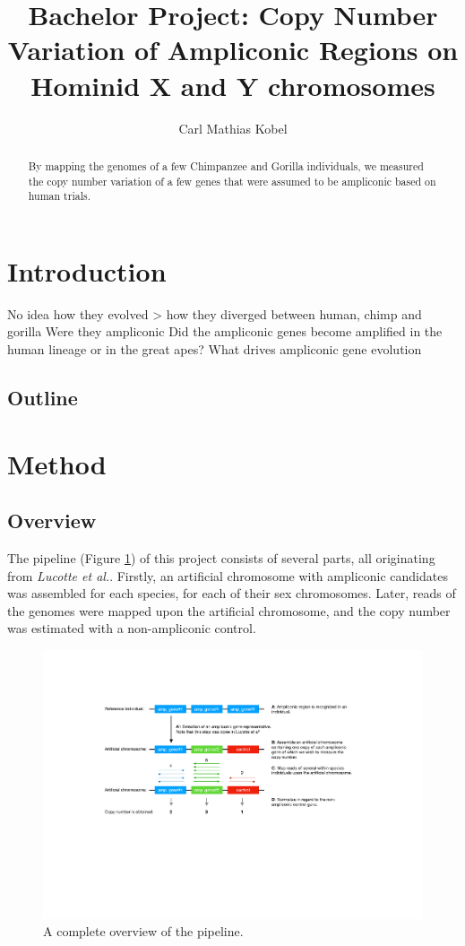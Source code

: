 \documentclass[
journal=jacsat, %
manuscript=article]{achemso}
\author{Carl Mathias Kobel}
\affiliation[Unknown University]
{BiRC, AU}
\title[\texttt{achemso} demonstration]
{Bachelor Project: Copy Number Variation of Ampliconic Regions on Hominid X and Y chromosomes}
\begin{document}
\begin{abstract}
By mapping the genomes of a few Chimpanzee and Gorilla individuals, we measured the copy number variation of a few genes that were assumed to be ampliconic based on human trials.
\end{abstract}

\clearpage
\section{Introduction}
No idea how they evolved > how they diverged between human, chimp and gorilla
Were they ampliconic 
Did the ampliconic genes become amplified in the human lineage or in the great apes?
What drives ampliconic gene evolution


\subsection{Outline}




\clearpage
\section{Method}

\subsection{Overview}
The pipeline (Figure \ref{fig:pipeline}) of this project consists of several parts, all originating from \textit{Lucotte et al.\cite{LucotteDyn}}. Firstly, an artificial chromosome with ampliconic candidates was assembled for each species, for each of their sex chromosomes. Later, reads of the genomes were mapped upon the artificial chromosome, and the copy number was estimated with a non-ampliconic control.


\begin{figure}
  \includegraphics[width=\linewidth]{illustrations/figure_pipeline.pdf}
  \caption{A complete overview of the pipeline.}
  \label{fig:pipeline}
\end{figure}
\end{document}
